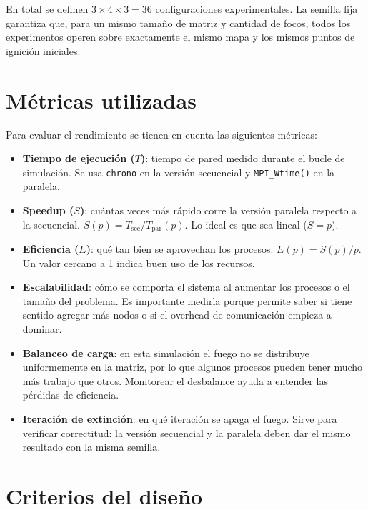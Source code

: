 \documentclass[12pt, a4paper]{article}
\begin{document}
En total se definen $3 \times 4 \times 3 = 36$ configuraciones experimentales. La semilla fija garantiza que, para un mismo tamaño de matriz y cantidad de focos, todos los experimentos operen sobre exactamente el mismo mapa y los mismos puntos de ignición iniciales.

\section{Métricas utilizadas}

Para evaluar el rendimiento se tienen en cuenta las siguientes métricas:

\begin{itemize}
    \item \textbf{Tiempo de ejecución ($T$)}: tiempo de pared medido durante el bucle de simulación. Se usa \texttt{chrono} en la versión secuencial y \texttt{MPI\_Wtime()} en la paralela.

    \item \textbf{Speedup ($S$)}: cuántas veces más rápido corre la versión paralela respecto a la secuencial. $S(p) = T_{\text{sec}} / T_{\text{par}}(p)$. Lo ideal es que sea lineal ($S = p$).

    \item \textbf{Eficiencia ($E$)}: qué tan bien se aprovechan los procesos. $E(p) = S(p) / p$. Un valor cercano a 1 indica buen uso de los recursos.

    \item \textbf{Escalabilidad}: cómo se comporta el sistema al aumentar los procesos o el tamaño del problema. Es importante medirla porque permite saber si tiene sentido agregar más nodos o si el overhead de comunicación empieza a dominar.

    \item \textbf{Balanceo de carga}: en esta simulación el fuego no se distribuye uniformemente en la matriz, por lo que algunos procesos pueden tener mucho más trabajo que otros. Monitorear el desbalance ayuda a entender las pérdidas de eficiencia.

    \item \textbf{Iteración de extinción}: en qué iteración se apaga el fuego. Sirve para verificar correctitud: la versión secuencial y la paralela deben dar el mismo resultado con la misma semilla.
\end{itemize}

\section{Criterios del diseño}
\end{document}
